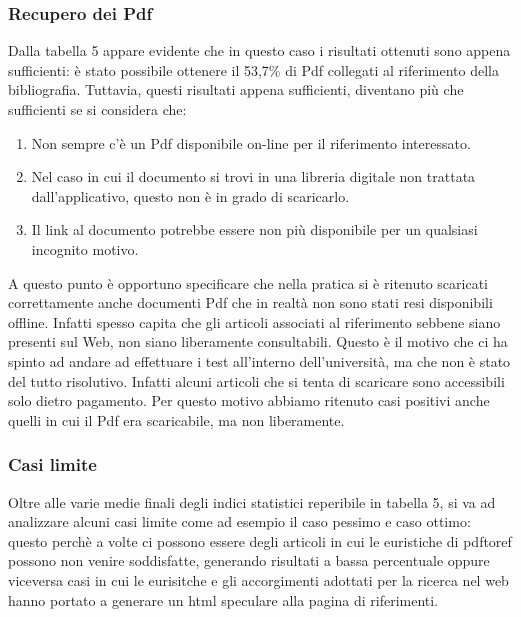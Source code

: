 \subsubsection{Recupero dei Pdf}
Dalla tabella 5 appare evidente che in questo caso i risultati ottenuti sono appena sufficienti: è stato possibile ottenere il 53,7\% di Pdf collegati al riferimento della bibliografia. Tuttavia, questi risultati appena sufficienti, diventano più che sufficienti se si considera che: 
\begin{enumerate}
 \item Non sempre c'è un Pdf disponibile on-line per il riferimento interessato.
 \item Nel caso in cui il documento si trovi in una libreria digitale non trattata dall'applicativo, questo non è in grado di scaricarlo.
 \item Il link al documento potrebbe essere non più disponibile per un qualsiasi incognito motivo.
\end{enumerate}
A questo punto è opportuno specificare che nella pratica si è ritenuto scaricati correttamente anche documenti Pdf che in realtà non sono stati resi disponibili offline. Infatti spesso capita che gli articoli associati al riferimento sebbene siano presenti sul Web, non siano liberamente consultabili. Questo è il motivo che ci ha spinto ad andare ad effettuare i test all'interno dell'università, ma che non è stato del tutto risolutivo. Infatti alcuni articoli che si tenta di scaricare sono accessibili solo dietro pagamento. Per questo motivo abbiamo ritenuto casi positivi anche quelli in cui il Pdf era scaricabile, ma non liberamente.


\subsubsection{Casi limite}
Oltre alle varie medie finali degli indici statistici reperibile in tabella 5, si va ad analizzare alcuni casi limite come ad esempio il caso pessimo e caso ottimo: questo perchè a volte ci possono essere degli articoli in cui le euristiche di pdftoref possono non venire soddisfatte, generando risultati a bassa percentuale oppure viceversa casi in cui le eurisitche e gli accorgimenti adottati per la ricerca nel web hanno portato a generare un html speculare alla pagina di riferimenti.\\

